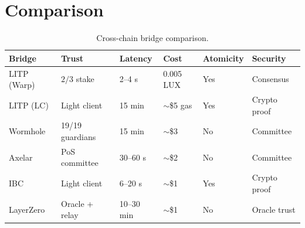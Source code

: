 \section{Comparison}
\label{sec:comparison}

\begin{table}[H]
\centering
\caption{Cross-chain bridge comparison.}
\label{tab:comparison}
\begin{tabular}{p{2.2cm}p{2cm}p{2cm}p{2cm}p{2cm}p{2cm}}
\toprule
\textbf{Bridge} & \textbf{Trust} & \textbf{Latency} & \textbf{Cost} & \textbf{Atomicity} & \textbf{Security} \\
\midrule
LITP (Warp) & $2/3$ stake & 2--4 s & 0.005 LUX & Yes & Consensus \\
LITP (LC) & Light client & 15 min & $\sim$\$5 gas & Yes & Crypto proof \\
Wormhole & 19/19 guardians & 15 min & $\sim$\$3 & No & Committee \\
Axelar & PoS committee & 30--60 s & $\sim$\$2 & No & Committee \\
IBC & Light client & 6--20 s & $\sim$\$1 & Yes & Crypto proof \\
LayerZero & Oracle + relay & 10--30 min & $\sim$\$1 & No & Oracle trust \\
\bottomrule
\end{tabular}
\end{table}

